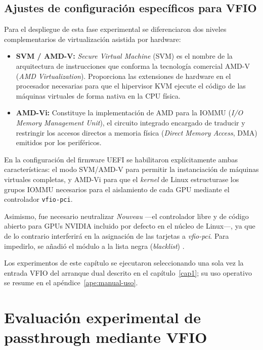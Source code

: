 \subsection{Ajustes de configuración específicos para VFIO}

Para el despliegue de esta fase experimental se diferenciaron dos niveles complementarios de virtualización asistida 
por hardware:

\begin{itemize}
    \item \textbf{SVM / AMD-V:} \textit{Secure Virtual Machine} (SVM) es el nombre de la arquitectura de instrucciones 
    que conforma la tecnología comercial AMD-V (\textit{AMD Virtualization}). Proporciona las extensiones de hardware 
    en el procesador necesarias para que el hipervisor KVM ejecute el código de las máquinas virtuales de forma nativa 
    en la CPU física.
    \item \textbf{AMD-Vi:} Constituye la implementación de AMD para la IOMMU 
    (\textit{I/O Memory Management Unit}), el circuito integrado encargado de traducir y restringir los 
    accesos directos a memoria física (\textit{Direct Memory Access}, DMA) emitidos por los periféricos.
\end{itemize}

En la configuración del firmware UEFI se habilitaron explícitamente ambas características: el modo SVM/AMD-V para permitir la
instanciación de máquinas virtuales completas, y AMD-Vi para que el \textit{kernel} de Linux estructurase los grupos IOMMU
necesarios para el aislamiento de cada GPU mediante el controlador \texttt{vfio-pci}.

Asimismo, fue necesario neutralizar \textit{Nouveau} ---el controlador libre y de código abierto 
para GPUs NVIDIA incluido por defecto en el núcleo de Linux---, ya que de lo contrario interferirá en 
la asignación de las tarjetas a \textit{vfio-pci}. Para impedirlo, 
se añadió el módulo a la lista negra (\textit{blacklist}) \cite{arch_nouveau}.

Los experimentos de este capítulo se ejecutaron seleccionando una sola vez la entrada VFIO del arranque dual descrito en el 
capítulo~\ref{cap1}; su uso operativo se resume en el apéndice~\ref{ape:manual-uso}.

\section{Evaluación experimental de passthrough mediante VFIO}

